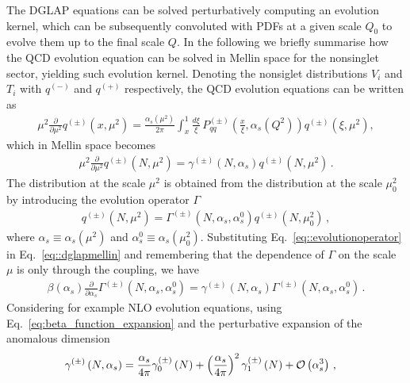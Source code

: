 %
The DGLAP equations can be solved perturbatively computing an evolution kernel, which can be subsequently convoluted
with PDFs at a given scale $Q_0$ to evolve them up to the final scale $Q$.
In the following we briefly summarise how the QCD evolution equation can be solved in Mellin space for the
nonsinglet sector, yielding such evolution kernel.
%
Denoting the nonsiglet distributions $V_i$ and $T_i$ with $q^{(-)}$ and
$q^{(+)} $ respectively, the QCD evolution equations can be written as
\begin{align}
    \mu^2\frac{\partial }{\partial \mu^2} q^{(\pm)}\left(x,\mu^2\right) = 
    \frac{\alpha_s(\mu^2)}{2\pi}
    \int_{x}^{1}\frac{d\xi}{\xi}\, 
    P_{qq}^{(\pm)}\left(\frac{x}{\xi},\alpha_s(Q^2)\right)
    q^{(\pm)}\left(\xi,\mu^2\right),
\end{align}
which in Mellin space becomes
\begin{align}
\label{eq::dglapmellin}
    \mu^2\frac{\partial }{\partial \mu^2} q^{(\pm)}\left(N,\mu^2\right) = 
    \gamma^{(\pm)}\left(N, \alpha_s\right) q^{(\pm)}\left(N,\mu^2\right)\, .
\end{align}
The distribution at the scale $\mu^2$ is obtained from the distribution at the
scale $\mu_0^2$ by introducing the evolution operator $\Gamma$
\begin{align}
\label{eq::evolutionoperator}
    q^{(\pm)}\left(N,\mu^2\right) = 
    \Gamma^{(\pm)}\left(N,\alpha_s,\alpha_s^0\right)
    q^{(\pm)}\left(N,\mu_0^2\right)\, ,
\end{align}
where $\alpha_s \equiv \alpha_s\left(\mu^2\right)$ and $\alpha_s^0 \equiv
\alpha_s\left(\mu_0^2\right)$. Substituting Eq.~\eqref{eq::evolutionoperator} in
Eq.~\eqref{eq::dglapmellin} and remembering that the dependence of $\Gamma$ on
the scale $\mu$ is only through the coupling, we have
\begin{align}
\label{eq::Mdglap}
    \beta\left(\alpha_s\right) \frac{\partial}{\partial\alpha_s}
    \Gamma^{(\pm)}\left(N,\alpha_s,\alpha_s^0\right) = 
    \gamma^{(\pm)}\left(N, \alpha_s\right)
    \Gamma^{(\pm)}\left(N,\alpha_s,\alpha_s^0\right)\, .
\end{align}
%
Considering for example NLO evolution equations, using Eq.~\eqref{eq:beta_function_expansion}
and the perturbative expansion of the anomalous dimension 
\begin{align}
    & \gamma^{(\pm)}\left(N, \alpha_s\right) = 
    \frac{\alpha_s}{4\pi} \gamma^{(\pm)}_0\left(N\right) + 
    \left(\frac{\alpha_s}{4\pi}\right)^2 \gamma^{(\pm)}_1\left(N\right) + \mathcal{O}\left( \alpha_s^3 \right)\, ,
\end{align}

